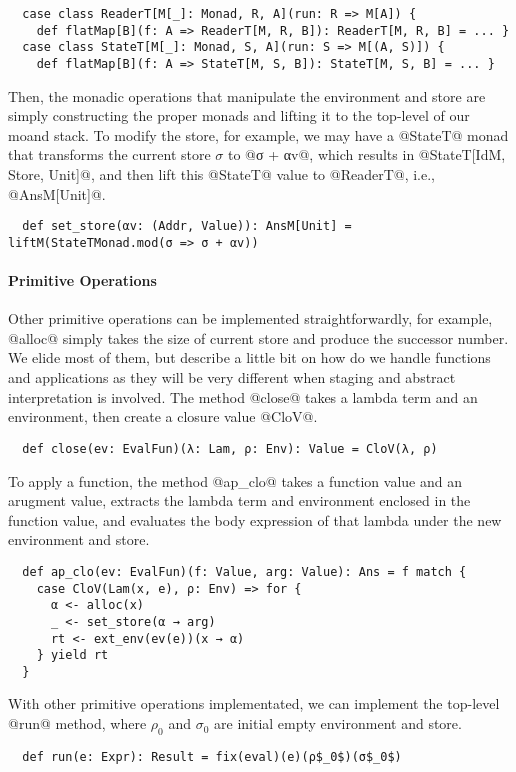 \begin{lstlisting}
  case class ReaderT[M[_]: Monad, R, A](run: R => M[A]) {
    def flatMap[B](f: A => ReaderT[M, R, B]): ReaderT[M, R, B] = ... }
  case class StateT[M[_]: Monad, S, A](run: S => M[(A, S)]) {
    def flatMap[B](f: A => StateT[M, S, B]): StateT[M, S, B] = ... }
\end{lstlisting}

Then, the monadic operations that manipulate the environment and store are
simply constructing the proper monads and lifting it to the top-level of our
moand stack. To modify the store, for example, we may have a @StateT@ monad that
transforms the current store $\sigma$ to @σ + αv@, which results in
@StateT[IdM, Store, Unit]@, and then lift this @StateT@ value to @ReaderT@,
i.e., @AnsM[Unit]@.
\begin{lstlisting}
  def set_store(αv: (Addr, Value)): AnsM[Unit] = liftM(StateTMonad.mod(σ => σ + αv))
\end{lstlisting}

\paragraph{Primitive Operations}
Other primitive operations can be implemented straightforwardly, for example,
@alloc@ simply takes the size of current store and produce the successor number.
We elide most of them, but describe a little bit on how do we handle functions
and applications as they will be very different when staging and abstract
interpretation is involved. The method @close@ takes a lambda term and an
environment, then create a closure value @CloV@.

\begin{lstlisting}
  def close(ev: EvalFun)(λ: Lam, ρ: Env): Value = CloV(λ, ρ)
\end{lstlisting}

To apply a function, the method @ap_clo@ takes a function value and an arugment
value, extracts the lambda term and environment enclosed in the function value,
and evaluates the body expression of that lambda under the new environment and store.

\begin{lstlisting}
  def ap_clo(ev: EvalFun)(f: Value, arg: Value): Ans = f match {
    case CloV(Lam(x, e), ρ: Env) => for {
      α <- alloc(x)
      _ <- set_store(α → arg)
      rt <- ext_env(ev(e))(x → α)
    } yield rt
  }
\end{lstlisting}

With other primitive operations implementated, we can implement the top-level
@run@ method, where $\rho_0$ and $\sigma_0$ are initial empty environment and
store.

\begin{lstlisting}
  def run(e: Expr): Result = fix(eval)(e)(ρ$_0$)(σ$_0$)
\end{lstlisting}
